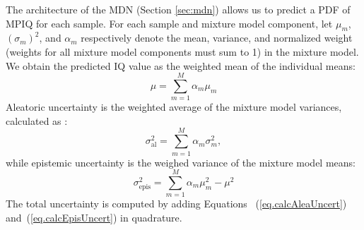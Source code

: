 



The architecture of the MDN (Section \ref{sec:mdn}) allows us to predict a PDF of MPIQ for each sample. For each sample and mixture model component, let $\mu_m$, $(\sigma_m)^2$, and $\alpha_m$ respectively denote the mean, variance, and normalized weight (weights for all mixture model components must sum to 1) in the mixture model. We obtain the predicted IQ value as the weighted mean of the individual means: 
\begin{equation}
\mu = \sum_{m=1}^M \alpha_m \mu_m \label{eq.calcIQpredict}
\end{equation}
Aleatoric uncertainty is the weighted average of the mixture model variances, calculated as \citep{choi2018uncertainty}:
\begin{equation}
\sigma_{\mathrm{al}}^2 =  \sum_{m=1}^{M} \alpha_m\sigma_m^2, \label{eq.calcAleaUncert}
\end{equation}
while epistemic uncertainty is the weighed variance of the mixture model means: 
\begin{equation}
\sigma_{\mathrm{epis}}^2 = \sum_{m=1}^{M} \alpha_m \mu_m^{2} - \mu^{2} \label{eq.calcEpisUncert}
\end{equation}
The total uncertainty is computed by adding Equations ~(\ref{eq.calcAleaUncert}) and~(\ref{eq.calcEpisUncert}) in quadrature.%